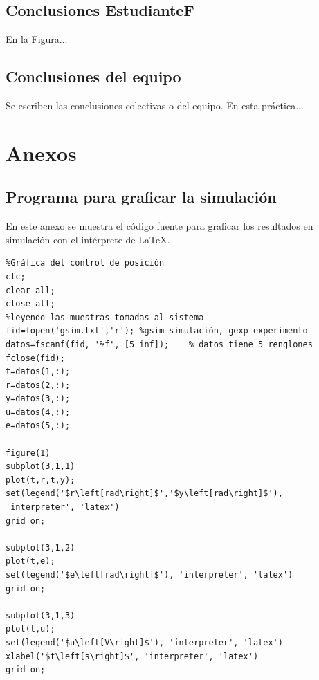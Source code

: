 \documentclass{article}
\begin{document}
\subsection{Conclusiones EstudianteF}
En la Figura...
 
\subsection{Conclusiones del equipo}
Se escriben las conclusiones colectivas o del equipo. En esta práctica...




\vspace{10 mm}

\newpage
\section{Anexos}

\subsection{Programa para graficar la simulación}\label{proggsim}
En este anexo se muestra el código fuente para graficar los resultados en simulación con el intérprete de LaTeX.
{\scriptsize
\begin{verbatim}
%Gráfica del control de posición
clc;
clear all;
close all;
%leyendo las muestras tomadas al sistema
fid=fopen('gsim.txt','r'); %gsim simulación, gexp experimento
datos=fscanf(fid, '%f', [5 inf]);    % datos tiene 5 renglones
fclose(fid);
t=datos(1,:); 
r=datos(2,:);
y=datos(3,:);
u=datos(4,:);
e=datos(5,:);

figure(1)
subplot(3,1,1)
plot(t,r,t,y);
set(legend('$r\left[rad\right]$','$y\left[rad\right]$'), 'interpreter', 'latex')
grid on;

subplot(3,1,2)
plot(t,e);
set(legend('$e\left[rad\right]$'), 'interpreter', 'latex')
grid on;

subplot(3,1,3)
plot(t,u);
set(legend('$u\left[V\right]$'), 'interpreter', 'latex')
xlabel('$t\left[s\right]$', 'interpreter', 'latex')
grid on;
\end{verbatim}
}
\end{document}
